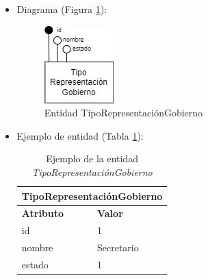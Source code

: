 \begin{itemize}
\begin{itemize}
        \item estado
        \begin{itemize}
            \item Definición: estado del tipo de representación del gobierno.
            \item Dominio: 1 (Habilitado), 0 (Deshabilitado).
            \item Tipo: atributo simple.
            \item Opcional: no
            \item Ejemplo: 1
        \end{itemize}
    \end{itemize}

    \item Diagrama (Figura \ref{fig:E-TipoRepresentaciónGobierno}):

    \begin{figure}[H]
        \centering
        \includegraphics[scale=0.8]{img/diagramas/EER/E-TipoRepresentaciónGobierno.png}
        \caption{Entidad TipoRepresentaciónGobierno}
        \label{fig:E-TipoRepresentaciónGobierno}
    \end{figure}

    \item Ejemplo de entidad (Tabla \ref{table:T-TipoRepresentaciónGobierno}):

    \begin{table}[H]
    \centering
        \begin{tabular}{ |p{6cm}||p{6cm}|  }
             \hline
                \multicolumn{2}{|c|}{\textbf{TipoRepresentaciónGobierno}} \\
             \hline
                 \textbf{Atributo} & \textbf{Valor} \\
             \hline
                 id & 1 \\
             \hline
                 nombre & Secretario \\
             \hline
                 estado & 1 \\
        \end{tabular}
        \caption{Ejemplo de la entidad \textit{TipoRepresentaciónGobierno}}
        \label{table:T-TipoRepresentaciónGobierno}
    \end{table}
\end{itemize}

